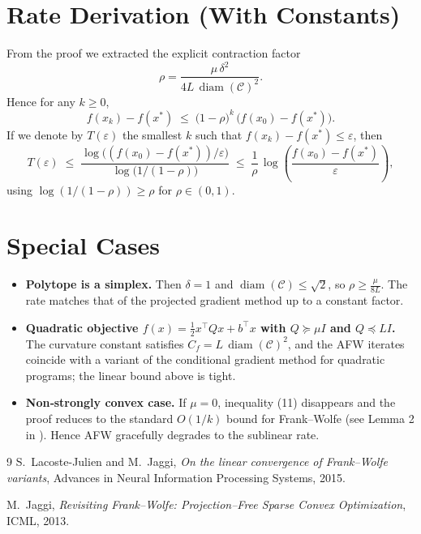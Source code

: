 \documentclass{article}
\newcommand{\C}{\mathcal{C}}
\newcommand{\diam}{\operatorname{diam}}
\begin{document}
\section*{Rate Derivation (With Constants)}
From the proof we extracted the explicit contraction factor
\[
\rho = \frac{\mu\,\delta^{2}}{4L\,\diam(\C)^{2}}.
\]
Hence for any $k\ge 0$,
\[
f(x_{k})-f(x^{*})\;\le\;
\bigl(1-\rho\bigr)^{k}\,\bigl(f(x_{0})-f(x^{*})\bigr).
\]
If we denote by $T(\varepsilon)$ the smallest $k$ such that $f(x_{k})-f(x^{*})\le\varepsilon$, then
\[
T(\varepsilon)\;\le\;
\frac{\log\bigl((f(x_{0})-f(x^{*}))/\varepsilon\bigr)}{\log\bigl(1/(1-\rho)\bigr)}
\;\le\;
\frac{1}{\rho}\,\log\!\left(\frac{f(x_{0})-f(x^{*})}{\varepsilon}\right),
\]
using $\log(1/(1-\rho))\ge\rho$ for $\rho\in(0,1)$.

\section*{Special Cases}
\begin{itemize}
\item \textbf{Polytope is a simplex.} Then $\delta=1$ and $\diam(\C)\le\sqrt{2}$, so $\rho\ge \frac{\mu}{8L}$. The rate matches that of the projected gradient method up to a constant factor.
\item \textbf{Quadratic objective $f(x)=\frac12 x^{\top}Qx+b^{\top}x$ with $Q\succeq\mu I$ and $Q\preceq L I$.} The curvature constant satisfies $C_{f}=L\,\diam(\C)^{2}$, and the AFW iterates coincide with a variant of the conditional gradient method for quadratic programs; the linear bound above is tight.
\item \textbf{Non‑strongly convex case.} If $\mu=0$, inequality (11) disappears and the proof reduces to the standard $O(1/k)$ bound for Frank–Wolfe (see Lemma 2 in \cite{Jaggi2013}). Hence AFW gracefully degrades to the sublinear rate.
\end{itemize}

\begin{thebibliography}{9}
S.~Lacoste-Julien and M.~Jaggi, \emph{On the linear convergence of Frank–Wolfe variants}, Advances in Neural Information Processing Systems, 2015.

M.~Jaggi, \emph{Revisiting Frank–Wolfe: Projection–Free Sparse Convex Optimization}, ICML, 2013.
\end{thebibliography}
\end{document}
